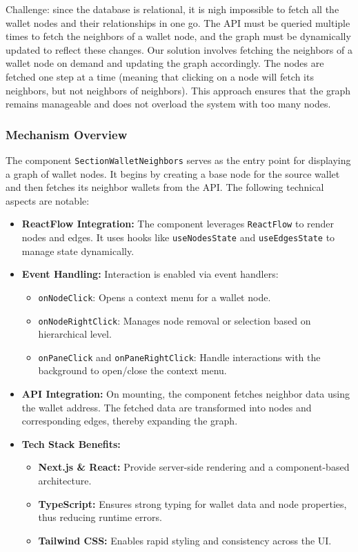 Challenge: since the database is relational, it is nigh impossible to fetch all the wallet nodes and their relationships in one go. The API must be queried multiple times to fetch the neighbors of a wallet node, and the graph must be dynamically updated to reflect these changes.
Our solution involves fetching the neighbors of a wallet node on demand and updating the graph accordingly. The nodes are fetched one step at a time (meaning that clicking on a node will fetch its neighbors, but not neighbors of neighbors). This approach ensures that the graph remains manageable and does not overload the system with too many nodes.

\subsubsection{Mechanism Overview}
The component \texttt{SectionWalletNeighbors} serves as the entry point for displaying a graph of wallet nodes. It begins by creating a base node for the source wallet and then fetches its neighbor wallets from the API. The following technical aspects are notable:

\begin{itemize}
    \item \textbf{ReactFlow Integration:} The component leverages \texttt{ReactFlow} to render nodes and edges. It uses hooks like \texttt{useNodesState} and \texttt{useEdgesState} to manage state dynamically.
    \item \textbf{Event Handling:} Interaction is enabled via event handlers:
    \begin{itemize}
        \item \texttt{onNodeClick}: Opens a context menu for a wallet node.
        \item \texttt{onNodeRightClick}: Manages node removal or selection based on hierarchical level.
        \item \texttt{onPaneClick} and \texttt{onPaneRightClick}: Handle interactions with the background to open/close the context menu.
    \end{itemize}
    \item \textbf{API Integration:} On mounting, the component fetches neighbor data using the wallet address. The fetched data are transformed into nodes and corresponding edges, thereby expanding the graph.
    \item \textbf{Tech Stack Benefits:} 
    \begin{itemize}
        \item \textbf{Next.js \& React:} Provide server-side rendering and a component-based architecture.
        \item \textbf{TypeScript:} Ensures strong typing for wallet data and node properties, thus reducing runtime errors.
        \item \textbf{Tailwind CSS:} Enables rapid styling and consistency across the UI.
    \end{itemize}
\end{itemize}

